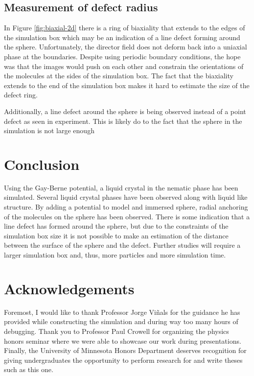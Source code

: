 \documentclass[preprint, aps]{revtex4-1}
\begin{document}
\subsection*{Measurement of defect radius}
In Figure \ref{fig:biaxial-2d} there is a ring of biaxiality that extends to the
edges of the simulation box which may be an indication of a line defect forming
around the sphere. Unfortunately, the director field does not deform back into a
uniaxial phase at the boundaries. Despite using periodic boundary conditions,
the hope was that the images would push on each other and constrain the
orientations of the molecules at the sides of the simulation box. The fact that
the biaxiality extends to the end of the simulation box makes it hard to
estimate the size of the defect ring.

Additionally, a line defect around the sphere is being observed instead of a
point defect as seen in experiment. This is likely do to the fact that the
sphere in the simulation is not large enough \cite{lubensky98}

\section*{Conclusion}
Using the Gay-Berne potential, a liquid crystal in the nematic phase has been
simulated. Several liquid crystal phases have been observed along with liquid
like structure. By adding a potential to model and immersed sphere, radial
anchoring of the molecules on the sphere has been observed. There is some
indication that a line defect has formed around the sphere, but due to the
constraints of the simulation box size it is not possible to make an estimation
of the distance between the surface of the sphere and the defect. Further
studies will require a larger simulation box and, thus, more particles and more
simulation time. 

\section*{Acknowledgements}
Foremost, I would like to thank Professor Jorge Vi\~nals for the guidance he has
provided while constructing the simulation and during way too many hours of
debugging. Thank you to Professor Paul Crowell for organizing the physics honors
seminar where we were able to showcase our work during presentations. Finally,
the University of Minnesota Honors Department deserves recognition for giving 
undergraduates the opportunity to perform research for and write theses such as 
this one.


{}

\end{document}
